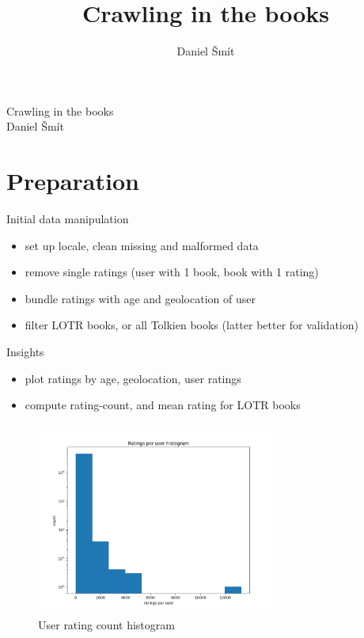 \documentclass[9pt]{beamer}
\author{Daniel \v{S}m\'{i}t}
\title{Crawling in the books}
\begin{document}
\begin{frame}{}
	\centering\Large
	\vspace{1em}
	{Crawling in the books\\}
	\vspace{1em}
	{Daniel \v{S}m\'{i}t\\}
	\vspace{1em}
\end{frame}

\section{Preparation}

\begin{frame}{Initial data manipulation}
	\begin{itemize}
		\item set up locale, clean missing and malformed data
		\item remove single ratings (user with 1 book, book with 1 rating)
		\item bundle ratings with age and geolocation of user
		\item filter LOTR books, or all Tolkien books (latter better for validation)
	\end{itemize}
\end{frame}

\begin{frame}{Insights}
	\begin{itemize}
		\item plot ratings by age, geolocation, user ratings
		\item compute rating-count, and mean rating for LOTR books
	\end{itemize}
	\begin{figure}
		\centering
		\includegraphics[width=0.7\textwidth]{../img/user-hist.png}
		\caption{User rating count histogram}
	\end{figure}
\end{frame}
\end{document}
